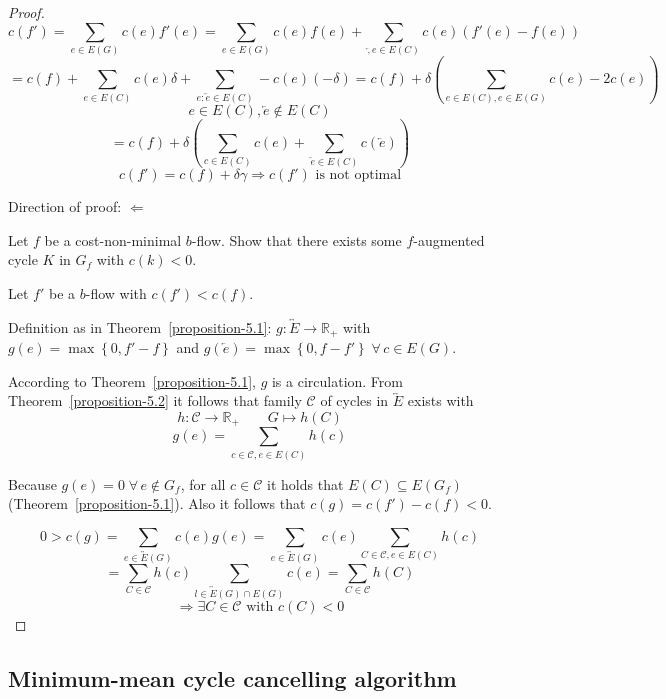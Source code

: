 \documentclass{article}
\newcommand{\set}[1]{\left\{#1\right\}}
\newcommand{\fall}{\;\forall\,}
\begin{document}
\begin{proof}
  \[
    c(f') = \sum_{e \in E(G)} c(e) f'(e) = \sum_{e \in E(G)} c(e) f(e) + \sum_{\overleftarrow, e \in E(C)} c(e)(f'(e) - f(e))
  \] \[
    = c(f) + \sum_{e \in E(C)} c(e) \delta + \sum_{e: \overleftarrow{e} \in E(C)} -c(e)(-\delta)
    = c(f) + \delta\left(\sum_{e \in E(C), e \in E(G)} c(e) - 2c(e)\right)
  \] \[
    e \in E(C), \overleftarrow{e} \notin E(C)
  \] \[
    = c(f) + \delta\left(\sum_{c \in E(C)} c(e) + \sum_{\overleftarrow{e} \in E(C)} c(\overleftarrow{e}) \right)
  \] \[
    c(f') = c(f) + \delta\gamma \Rightarrow c(f') \text{ is not optimal}
  \]

  Direction of proof: $\Leftarrow$

  Let $f$ be a cost-non-minimal $b$-flow. Show that there exists some $f$-augmented cycle $K$ in $G_f$ with $c(k) < 0$.

  Let $f'$ be a $b$-flow with $c(f') < c(f)$.

  Definition as in Theorem~\ref{proposition-5.1}: $g: \overleftrightarrow{E} \rightarrow \mathbb{R}_+$ with $g(e) = \max\set{0, f' - f}$ and $g(\overleftarrow{e}) = \max\set{0, f - f'} \fall c \in E(G)$.

  According to Theorem~\ref{proposition-5.1}, $g$ is a circulation. From Theorem~\ref{proposition-5.2} it follows that family $\mathcal{C}$ of cycles in $\overleftrightarrow{E}$ exists with
  \[
    h: \mathcal{C} \rightarrow \mathbb{R}_+  \qquad G \mapsto h(C)
  \] \[
    g(e) = \sum_{c \in \mathcal{C}, e \in E(C)} h(c)
  \]

  Because $g(e) = 0 \fall e \notin G_f$, for all $c \in \mathcal{C}$ it holds that $E(C) \subseteq E(G_f)$ (Theorem~\ref{proposition-5.1}). Also it follows that $c(g) = c(f') - c(f) < 0$.

  \[
    0 > c(g)
      = \sum_{e \in \overleftrightarrow{E}(G)} c(e) g(e)
      = \sum_{e \in \overleftrightarrow{E}(G)} c(e) \sum_{C \in \mathcal{C}, e \in E(C)} h(c)
  \] \[
      = \sum_{C \in \mathcal{C}} h(c) \sum_{l \in \overleftrightarrow{E}(G) \cap E(G)} c(e)
      = \sum_{C \in \mathcal{C}} h(C) 
  \] \[
    \Rightarrow \exists C \in \mathcal{C} \text{ with } c(C) < 0
  \]
\end{proof}

\subsection{Minimum-mean cycle cancelling algorithm}
\end{document}
